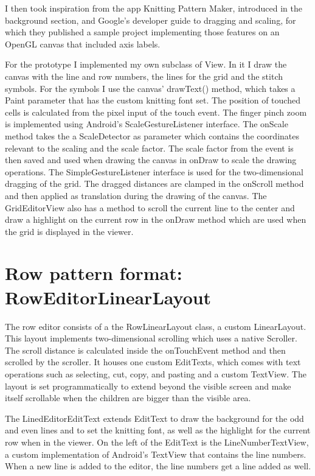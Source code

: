 I then took inspiration from the app Knitting Pattern Maker, introduced in the background section, and Google’s developer guide to dragging and scaling, for which they published a sample project implementing those features on an OpenGL canvas that included axis labels.

For the prototype I implemented my own subclass of View. In it I draw the canvas with the line and row numbers, the lines for the grid and the stitch symbols. For the symbols I use the canvas’ drawText() method, which takes a Paint parameter that has the custom knitting font set. The position of touched cells is calculated from the pixel input of the touch event. The finger pinch zoom is implemented using Android’s ScaleGestureListener interface. The onScale method takes the a ScaleDetector as parameter which contains the coordinates relevant to the scaling and the scale factor. The scale factor from the event is then saved and used when drawing the canvas in onDraw to scale the drawing operations. The SimpleGestureListener interface is used for the two-dimensional dragging of the grid. The dragged distances are clamped in the onScroll method and then applied as translation during the drawing of the canvas.
The GridEditorView also has a method to scroll the current line to the center and draw a highlight on the current row in the onDraw method which are used when the grid is displayed in the viewer.

\section{Row pattern format: RowEditorLinearLayout}
The row editor consists of a the RowLinearLayout class, a custom LinearLayout. This layout implements two-dimensional scrolling which uses a native Scroller. The scroll distance is calculated inside the onTouchEvent method and then scrolled by the scroller. It houses one custom EditTexts, which comes with text operations such as selecting, cut, copy, and pasting and a custom TextView. The layout is set programmatically to extend beyond the visible screen and make itself scrollable when the children are bigger than the visible area.

The LinedEditorEditText extends EditText to draw the background for the odd and even lines and to set the knitting font, as well as the highlight for the current row when in the viewer. On the left of the EditText is the LineNumberTextView, a custom implementation of Android’s TextView that contains the line numbers. When a new line is added to the editor, the line numbers get a line added as well.


